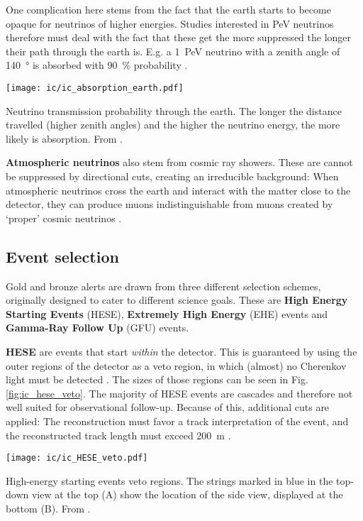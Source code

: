 One complication here stems from the fact that the earth starts to become opaque for neutrinos of higher energies. Studies interested in \si{\peta\eV} neutrinos therefore must deal with the fact that these get the more suppressed the longer their path through the earth is. E.g. a \SI{1}{\peta\eV} neutrino with a zenith angle of \SI{140}{\degree} is absorbed with \SI{90}{\percent} probability .

\begin{marginfigure}
    \texttt{[image: ic/ic\_absorption\_earth.pdf]}
    \caption[Neutrino absorption in the earth]{Neutrino transmission probability through the earth. The longer the distance travelled (higher zenith angles) and the higher the neutrino energy, the more likely is absorption. From \cite{Aartsen2017c}.}
\end{marginfigure}

\textbf{Atmospheric neutrinos} also stem from cosmic ray showers. These are cannot be suppressed by directional cuts, creating an irreducible background: When atmospheric neutrinos cross the earth and interact with the matter close to the detector, they can produce muons indistinguishable from muons created by `proper' cosmic neutrinos \cite{Ahlers2018a}.

\subsection{Event selection} \label{ic_event_selection}
Gold and bronze alerts are drawn from three different selection schemes, originally designed to cater to different science goals. These are \textbf{High Energy Starting Events} (HESE), \textbf{Extremely High Energy} (EHE) events and \textbf{Gamma-Ray Follow Up} (GFU) events.

\textbf{HESE} are events that start \textit{within} the detector. This is guaranteed by using the outer regions of the detector as a veto region, in which (almost) no Cherenkov light must be detected . The sizes of those regions can be seen in Fig. \ref{fig:ic_hese_veto}. The majority of HESE events are cascades and therefore not well suited for observational follow-up. Because of this, additional cuts are applied: The reconstruction must favor a track interpretation of the event, and the reconstructed track length must exceed \SI{200}{\meter} \cite{Tung2019}.
\begin{marginfigure}
    \texttt{[image: ic/ic\_HESE\_veto.pdf]}
    \caption[HESE veto regions]{High-energy starting events veto regions. The strings marked in blue in the top-down view at the top (A) show the location of the side view, displayed at the bottom (B). From \cite{Aartsen2013}.}
\end{marginfigure}

